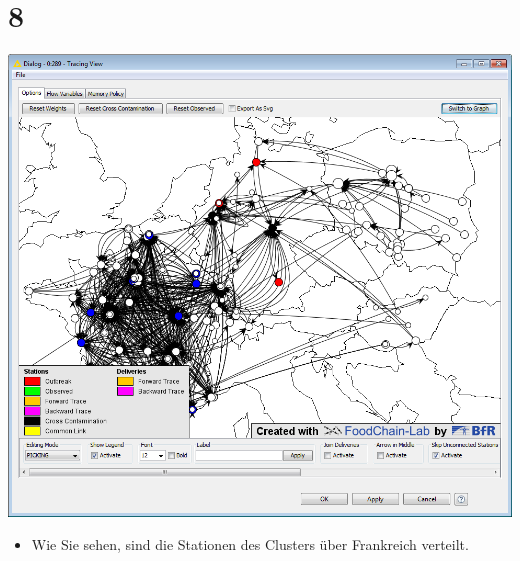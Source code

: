\documentclass{beamer}
\begin{document}
\section{8}
\begin{frame}
	\begin{center}
  		\includegraphics[height=0.6\textheight]{8.png}
	\end{center}
	\begin{itemize}
		\item Wie Sie sehen, sind die Stationen des Clusters über Frankreich verteilt.
	\end{itemize}
\end{frame}
\end{document}
